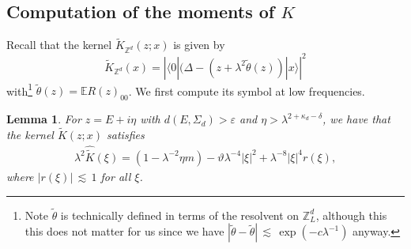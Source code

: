 \documentclass[11pt]{amsart}
\def\bbZ{{\mathbb Z}}
\def\Expec{{\mathbb E}}
\def\eps{{\varepsilon}}
\def\lsim{{\,\lesssim\,}}
\def\Braket#1{\langle{#1}\rangle}
\numberwithin{equation}{section}
\numberwithin{theorem}{section}
\newtheorem{lemma}[theorem]{Lemma}
\begin{document}
\subsection{Computation of the moments of $K$}
Recall that the kernel $\tilde{K}_{\bbZ^d}(z;x)$ is given by
\[
\tilde{K}_{\bbZ^d}(x) = |\Braket{0| (\Delta - (z+\lambda^2\tilde{\theta}(z))|x}|^2
\]
with\footnote{Note $\tilde{\theta}$ is technically defined in terms of the resolvent on $\bbZ^d_L$, although this this does not matter for us since we have $|\tilde{\theta}-\tilde{\theta}|\lsim \exp(-c\lambda^{-1})$  anyway.} $\tilde{\theta}(z)=\Expec R(z)_{00}$.
We first compute its symbol at low frequencies.
\begin{lemma}
\label{lem:KSymbol}
For $z=E+i\eta$ with $d(E,\Sigma_d) > \eps$ and $\eta>\lambda^{2+\kappa_d-\delta}$, we have that the kernel $\tilde{K}(z;x)$ satisfies
\begin{align*}
	\lambda^{2}\widehat{\tilde{K}}(\xi)=(1-\lambda^{-2}\eta m)-\vartheta\lambda^{-4}|\xi|^{2}+ \lambda^{-8} |\xi|^4 r(\xi),
\end{align*}
where $|r(\xi)| \lsim 1$ for all $\xi$.
\end{lemma}
\end{document}
